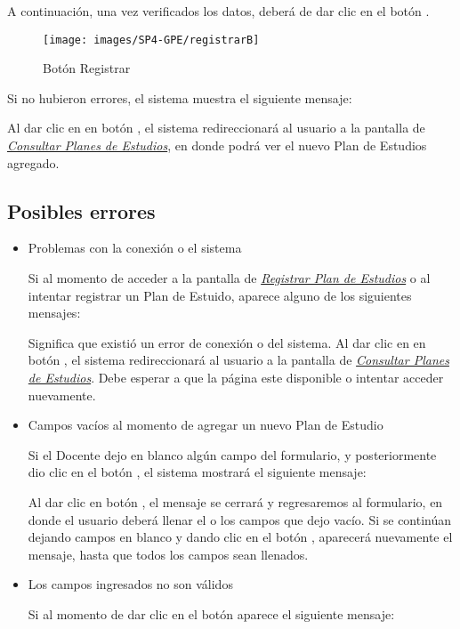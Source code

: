 A continuación, una vez verificados los datos, deberá de dar clic en el botón .
\begin{figure}[!hbtp]
    \centering
    \hypertarget{btnreg}{\texttt{[image: images/SP4-GPE/registrarB]}}
    \caption{Botón Registrar}
    \label{btnreg}
\end{figure}

Si no hubieron errores, el sistema muestra el siguiente mensaje:

Al dar clic en en botón , el sistema redireccionará al usuario a la pantalla de \hyperlink{consultarPE}{\textit{Consultar Planes de Estudios}}, en donde podrá ver el nuevo Plan de Estudios agregado.\\
\newpage
\subsection{Posibles errores}
\begin{itemize}

    \item Problemas con la conexión o el sistema

    Si al momento de acceder a la pantalla de \hyperlink{registrarPE}{\textit{Registrar Plan de Estudios}} o al intentar registrar un Plan de Estuido, aparece alguno de los siguientes mensajes:

    Significa que existió un error de conexión o del sistema. Al dar clic en en botón , el sistema redireccionará al usuario a la pantalla de \hyperlink{consultarPE}{\textit{Consultar Planes de Estudios}}. Debe esperar a que la página este disponible o intentar acceder nuevamente.

    \item Campos vacíos al momento de agregar un nuevo Plan de Estudio

    Si el Docente dejo en blanco algún campo del formulario, y posteriormente dio clic en el botón , el sistema mostrará el siguiente mensaje:

    Al dar clic en botón , el mensaje se cerrará y regresaremos al formulario, en donde el usuario deberá llenar el o los campos que dejo vacío. Si se continúan dejando campos en blanco y dando clic en el botón , aparecerá nuevamente el mensaje, hasta que todos los campos sean llenados.\\



    \item Los campos ingresados no son válidos

    Si al momento de dar clic en el botón  aparece el siguiente mensaje:


\end{itemize}
